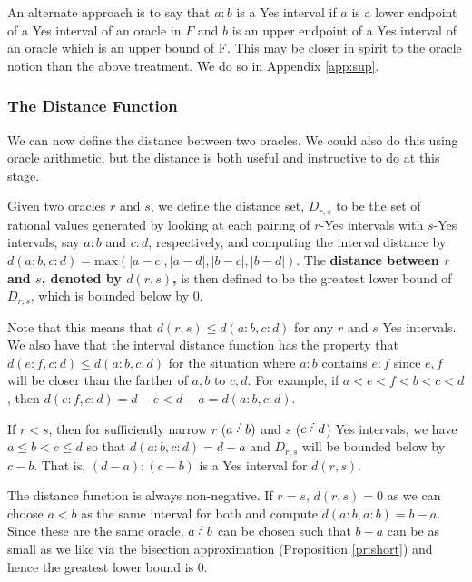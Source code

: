 \documentclass[12pt]{article}
\begin{document}
An alternate approach is to say that $a:b$ is a Yes interval if $a$ is a lower endpoint of a Yes interval of an oracle in $F$ and $b$ is an upper endpoint of a Yes interval of an oracle which is an upper bound of F. This may be closer in spirit to the oracle notion than the above treatment. We do so in Appendix \ref{app:sup}. 

\subsubsection{The Distance Function}

We can now define the distance between two oracles. We could also do this using oracle arithmetic, but the distance is both useful and instructive to do at this stage. 

Given two oracles $r$ and $s$, we define the distance set, $D_{r,s}$ to be the set of rational values generated by looking at each pairing of $r$-Yes intervals with $s$-Yes intervals, say  $a:b$ and $c:d$, respectively, and computing the interval distance by $d(a:b,c:d) = \mathrm{max}(|a-c|, |a-d|,|b-c|,|b-d|)$. The \textbf{distance between $r$ and $s$, denoted by $d(r,s)$,} is then defined to be the greatest lower bound of $D_{r,s}$, which is bounded below by 0. 

Note that this means that $d(r,s) \leq d(a:b, c:d)$ for any $r$ and $s$ Yes intervals. We also have that the interval distance function has the property that $d(e:f, c:d) \leq d(a:b, c:d)$ for the situation where $a:b$ contains $e:f$ since $e, f$ will be closer than the farther of $a,b$ to $c,d$. For example, if $a < e < f < b < c< d$, then $d(e:f, c:d) = d-e < d-a = d(a:b, c:d)$. 

If $r<s$, then for sufficiently narrow $r$ ($a\lte b)$ and $s$ ($c\lte d$) Yes intervals, we have $a\leq b<c \leq d$ so that $d(a:b,c:d) = d-a$ and $D_{r,s}$ will be bounded below by $c-b$. That is, $(d-a):(c-b)$ is a Yes interval for $d(r,s)$.

The distance function is always non-negative. If $r=s$, $d(r,s)=0$ as we can choose $a<b$ as the same interval for both and compute $d(a:b,a:b)= b-a$. Since these are the same oracle, $a\lte b$ can be chosen such that $b-a$ can be as small as we like via the bisection approximation (Proposition \ref{pr:short}) and hence the greatest lower bound is 0. 
\end{document}

